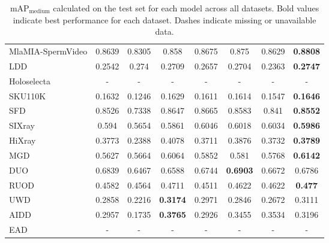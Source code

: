 \documentclass[runningheads]{llncs}
\begin{document}
\begin{table}[htbp]
\begin{tabular}{lccccccc}
MlaMIA-SpermVideo & 0.8639 & 0.8305 & 0.858 & 0.8675 & 0.875 & 0.8629 & \textbf{0.8808} \\
LDD & 0.2542 & 0.274 & 0.2709 & 0.2657 & 0.2704 & 0.2363 & \textbf{0.2747} \\
\hline
Holoselecta & - & - & - & - & - & - & - \\
SKU110K & 0.1632 & 0.1246 & 0.1629 & 0.1611 & 0.1614 & 0.1547 & \textbf{0.1646} \\
SFD & 0.8526 & 0.7338 & 0.8647 & 0.8665 & 0.8583 & 0.841 & \textbf{0.8552} \\
\hline
SIXray & 0.594 & 0.5654 & 0.5861 & 0.6046 & 0.6018 & 0.6034 & \textbf{0.5986} \\
HiXray & 0.3773 & 0.2388 & 0.4078 & 0.3711 & 0.3876 & 0.3732 & \textbf{0.3789} \\
MGD & 0.5627 & 0.5664 & 0.6064& 0.5852 & 0.581 & 0.5768 & \textbf{0.6142}\\
\hline
DUO & 0.6839 & 0.6467 & 0.6588 & 0.6744 & \textbf{0.6903} & 0.6672 & 0.6786 \\
RUOD & 0.4582 & 0.4564 & 0.4711 & 0.4511 & 0.4622 & 0.4622 & \textbf{0.477} \\
UWD & 0.2858 & 0.2216 & \textbf{0.3174}& 0.2971 & 0.2846 & 0.2672 & 0.3111\\
\hline
AIDD & 0.2957 & 0.1735 & \textbf{0.3765}& 0.2926 & 0.3455 & 0.3534 & 0.3196\\
EAD & - & - & - & - & - & - & - \\
\hline
\end{tabular}
\caption{mAP$_{\text{medium}}$ calculated on the test set for each model across all datasets. Bold values indicate best performance for each dataset. Dashes indicate missing or unavailable data.}
\label{tab:yolo_mapmedium_comparison}
\end{table}
\end{document}
